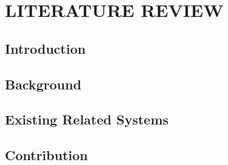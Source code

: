 \chapter{LITERATURE REVIEW}
\pagebreak

\section{Introduction}
\label{sec:lit-intro}


\section{Background}
\label{sec:background}


\section{Existing Related Systems}
\label{sec:related}


\section{Contribution}
\label{sec:contribution}

